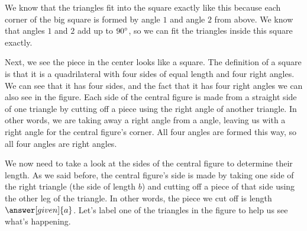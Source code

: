 \documentclass{ximera}
\begin{document}
\begin{explanation}
\begin{image}
\end{image}
We know that the triangles fit into the square exactly like this because each corner of the big square is formed by angle $1$ and angle $2$ from above. We know that angles $1$ and $2$ add up to $90\degree$, so we can fit the triangles inside this square exactly.

Next, we see the piece in the center looks like a square. The definition of a square is that it is 
a quadrilateral with four sides of equal length and four right angles. We can see that it has four sides, 
and the fact that it has four right angles we can also see in the figure. Each side of the central figure 
is made from a straight side of one triangle by cutting off a piece using the right angle of another triangle. 
In other words, we are taking away a right angle from a 
 angle, 
leaving us with a right angle for the central figure's corner. All four angles are formed this way, so all four 
angles are right angles.

We now need to take a look at the sides of the central figure to determine their length. As we said before, 
the central figure's side is made by taking one side of the right triangle (the side of length $b$) and 
cutting off a piece of that side using the other leg of the triangle. In other words, the piece we cut off is 
length $\answer[given]{a}$. Let's label one of the 
triangles in the figure to help us see what's happening.
\begin{image}
\end{image}
\end{explanation}
\end{document}
